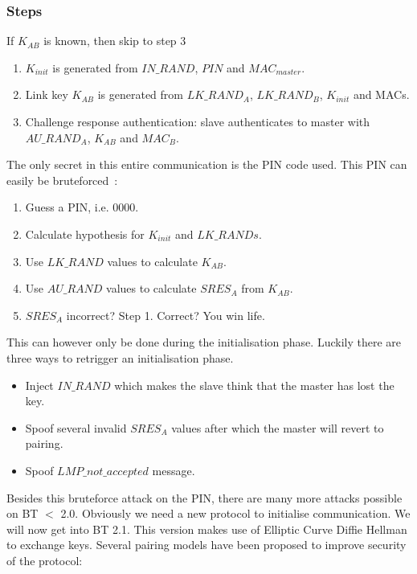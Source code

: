 \documentclass{article}
\begin{document}
\hspace{0.5cm}
\subsubsection*{Steps}
If $K_{AB}$ is known, then skip to step 3
\begin{enumerate}
\item $K_{init}$ is generated from $IN\_RAND$, $PIN$ and $MAC_{master}$.
\item Link key $K_{AB}$ is generated from $LK\_RAND_{A}$, $LK\_RAND_{B}$, $K_{init}$ and MACs.
\item Challenge response authentication: slave authenticates to master with $AU\_RAND_A$, $K_{AB}$ and $MAC_B$.
\end{enumerate}




\newpage

The only secret in this entire communication is the PIN code used. This PIN can easily be bruteforced~\cite{shaked2005cracking}:

\begin{enumerate}
\item Guess a PIN, i.e. 0000.
\item Calculate hypothesis for $K_{init}$ and $LK\_RANDs$.
\item Use $LK\_RAND$ values to calculate $K_{AB}$.
\item Use $AU\_RAND$ values to calculate $SRES_A$ from $K_{AB}$.
\item $SRES_A$ incorrect? Step 1. Correct? You win life.
\end{enumerate}

This can however only be done during the initialisation phase. Luckily there are three ways to retrigger an initialisation phase. 

\begin{itemize}
\item Inject $IN\_RAND$ which makes the slave think that the master has lost the key.
\item Spoof several invalid $SRES_A$ values after which the master will revert to pairing.
\item Spoof $LMP\_not\_accepted$ message.
\end{itemize}

Besides this bruteforce attack on the PIN, there are many more attacks possible on BT $<$ 2.0. Obviously we need a new protocol to initialise communication. We will now get into BT 2.1. This version makes use of Elliptic Curve Diffie Hellman to exchange keys. Several pairing models have been proposed to improve security of the protocol:
\end{document}
